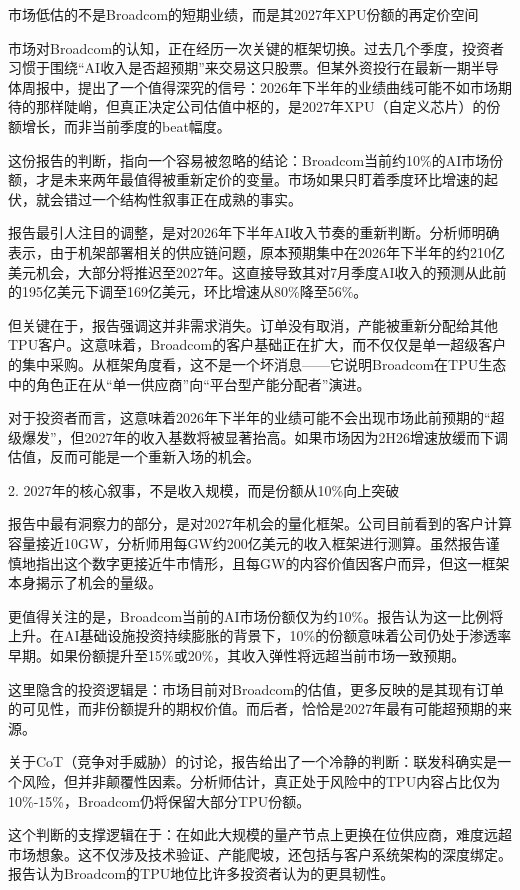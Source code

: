 \documentclass[11pt]{ctexart}
\begin{document}
市场低估的不是Broadcom的短期业绩，而是其2027年XPU份额的再定价空间

市场对Broadcom的认知，正在经历一次关键的框架切换。过去几个季度，投资者习惯于围绕“AI收入是否超预期”来交易这只股票。但某外资投行在最新一期半导体周报中，提出了一个值得深究的信号：2026年下半年的业绩曲线可能不如市场期待的那样陡峭，但真正决定公司估值中枢的，是2027年XPU（自定义芯片）的份额增长，而非当前季度的beat幅度。

这份报告的判断，指向一个容易被忽略的结论：Broadcom当前约10\%的AI市场份额，才是未来两年最值得被重新定价的变量。市场如果只盯着季度环比增速的起伏，就会错过一个结构性叙事正在成熟的事实。

报告最引人注目的调整，是对2026年下半年AI收入节奏的重新判断。分析师明确表示，由于机架部署相关的供应链问题，原本预期集中在2026年下半年的约210亿美元机会，大部分将推迟至2027年。这直接导致其对7月季度AI收入的预测从此前的195亿美元下调至169亿美元，环比增速从80\%降至56\%。

但关键在于，报告强调这并非需求消失。订单没有取消，产能被重新分配给其他TPU客户。这意味着，Broadcom的客户基础正在扩大，而不仅仅是单一超级客户的集中采购。从框架角度看，这不是一个坏消息——它说明Broadcom在TPU生态中的角色正在从“单一供应商”向“平台型产能分配者”演进。

对于投资者而言，这意味着2026年下半年的业绩可能不会出现市场此前预期的“超级爆发”，但2027年的收入基数将被显著抬高。如果市场因为2H26增速放缓而下调估值，反而可能是一个重新入场的机会。

2. 2027年的核心叙事，不是收入规模，而是份额从10\%向上突破

报告中最有洞察力的部分，是对2027年机会的量化框架。公司目前看到的客户计算容量接近10GW，分析师用每GW约200亿美元的收入框架进行测算。虽然报告谨慎地指出这个数字更接近牛市情形，且每GW的内容价值因客户而异，但这一框架本身揭示了机会的量级。

更值得关注的是，Broadcom当前的AI市场份额仅为约10\%。报告认为这一比例将上升。在AI基础设施投资持续膨胀的背景下，10\%的份额意味着公司仍处于渗透率早期。如果份额提升至15\%或20\%，其收入弹性将远超当前市场一致预期。

这里隐含的投资逻辑是：市场目前对Broadcom的估值，更多反映的是其现有订单的可见性，而非份额提升的期权价值。而后者，恰恰是2027年最有可能超预期的来源。

关于CoT（竞争对手威胁）的讨论，报告给出了一个冷静的判断：联发科确实是一个风险，但并非颠覆性因素。分析师估计，真正处于风险中的TPU内容占比仅为10\%-15\%，Broadcom仍将保留大部分TPU份额。

这个判断的支撑逻辑在于：在如此大规模的量产节点上更换在位供应商，难度远超市场想象。这不仅涉及技术验证、产能爬坡，还包括与客户系统架构的深度绑定。报告认为Broadcom的TPU地位比许多投资者认为的更具韧性。
\end{document}
